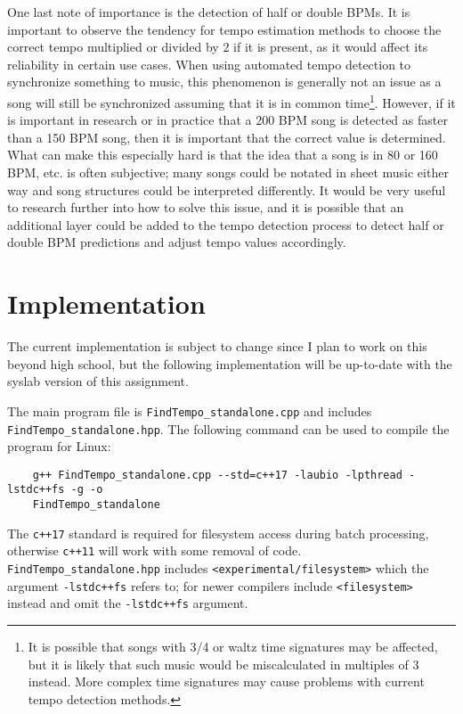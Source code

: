 \documentclass[11pt, oneside]{article}
\begin{document}
One last note of importance is the detection of half or double BPMs. It is
important to observe the tendency for tempo estimation methods to choose the
correct tempo multiplied or divided by 2 if it is present, as it would affect
its reliability in certain use cases. When using automated tempo detection to
synchronize something to music, this phenomenon is generally not an issue as a
song will still be synchronized assuming that it is in common time\footnote{It
is possible that songs with 3/4 or waltz time signatures may be affected, but it
is likely that such music would be miscalculated in multiples of 3 instead. More
complex time signatures may cause problems with current tempo detection
methods.}. However, if it is important in research or in practice that a 200 BPM
song is detected as faster than a 150 BPM song, then it is important that the
correct value is determined. What can make this especially hard is that the idea
that a song is in 80 or 160 BPM, etc. is often subjective; many songs could be
notated in sheet music either way and song structures could be interpreted
differently. It would be very useful to research further into how to solve this
issue, and it is possible that an additional layer could be added to the tempo
detection process to detect half or double BPM predictions and adjust tempo
values accordingly.


\section{Implementation}

The current implementation is subject to change since I plan to work on this
beyond high school, but the following implementation will be up-to-date with the
syslab version of this assignment.

\begin{sloppypar}
    The main program file is \texttt{FindTempo\_standalone.cpp} and includes
    \texttt{FindTempo\_standalone.hpp}. The following command can be used to
    compile the program for Linux:
\end{sloppypar}

\begin{lstlisting}
    g++ FindTempo_standalone.cpp --std=c++17 -laubio -lpthread -lstdc++fs -g -o 
    FindTempo_standalone
\end{lstlisting}
The \texttt{c++17} standard is required for filesystem access during batch
processing, otherwise \texttt{c++11} will work with some removal of code.
\texttt{FindTempo\_standalone.hpp} includes \texttt{<experimental/filesystem>}
which the argument \texttt{-lstdc++fs} refers to; for newer compilers include
\texttt{<filesystem>} instead and omit the \texttt{-lstdc++fs} argument.
\end{document}
